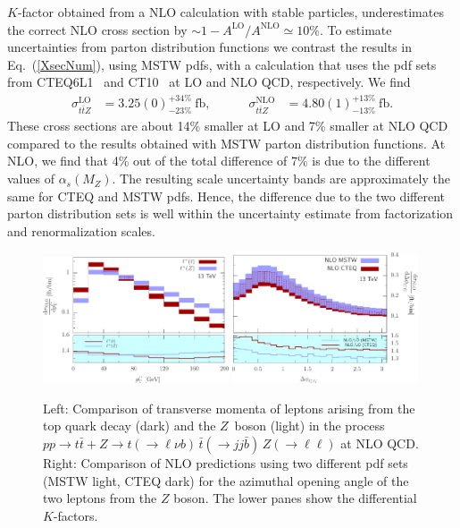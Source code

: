 \documentclass{JHEP3}
\def\ttb{t\bar{t}}
\newcommand{\be}{\begin{eqnarray}}
\newcommand{\ee}{\end{eqnarray}}
\begin{document}
$K$-factor obtained from a NLO calculation with stable particles,
underestimates the correct NLO cross section by $\sim 1-
A^\mathrm{LO}/A^\mathrm{NLO} \simeq 
10\%$.  To estimate uncertainties
from parton distribution functions we contrast the results in
Eq.~(\ref{XsecNum}), using MSTW pdfs, with a calculation that uses the
pdf sets from CTEQ6L1~\cite{Pumplin:2002vw} and CT10~\cite{Lai:2010vv}
at LO and NLO QCD, respectively.  We find \be
\label{XsecNumCTEQ}
  \sigma_{\ttb Z}^\mathrm{LO} &= 3.25(0)^{+34\%}_{-23\%}~\mathrm{fb},
  \quad\quad\quad
  \sigma_{\ttb Z}^\mathrm{NLO} &= 4.80(1)^{+13\%}_{-13\%}~\mathrm{fb}.
\ee
These cross sections are about 14\% smaller at LO and 7\% smaller at NLO QCD compared to the results obtained with MSTW parton distribution functions. 
At NLO, we find that 4\% out of the total difference of 7\% is due to the different values of $\alpha_s(M_Z)$.
The resulting scale uncertainty bands are approximately the same for CTEQ and MSTW pdfs.
Hence, the difference due to the two different parton distribution sets is well within the uncertainty estimate from factorization and renormalization scales.

\begin{figure}[t]
\centering
\includegraphics[width=0.49\textwidth]{./LHC_53_Fig01and03.pdf}
\hfill
\includegraphics[width=0.49\textwidth]{./LHC_53_Fig17e.pdf}
\caption{\label{fig:iii} Left: Comparison of transverse momenta of leptons arising from the top quark decay (dark) and the $Z$~boson  (light)
in the process $pp \to \ttb + Z \to t(\to \ell \nu b) \, \bar{t} (\to jj \bar{b}) \, Z(\to \ell \ell)$ at NLO QCD.
Right: Comparison of NLO predictions using two different pdf sets (MSTW light, CTEQ dark) for the azimuthal opening angle of the two leptons from the $Z$ boson.
The lower panes show the differential $K$-factors.}
\end{figure}
\end{document}
